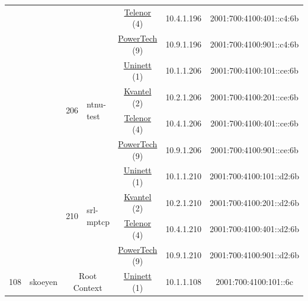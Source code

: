 \begin{small}
\begin{center}
\begin{longtable}{|c|c|c|c|c|c|c|c|}
  &  &  &  & \multicolumn{2}{|c|}{\tiny{\href{https://www.telenor.no}{Telenor} (4)}} & \tiny{10.4.1.196} & \tiny{2001:700:4100:401::c4:6b} \\* \cline{5-5}\cline{6-6}\cline{7-7}\cline{8-8}
  &  &  &  & \multicolumn{2}{|c|}{\tiny{\href{http://www.powertech.no}{PowerTech} (9)}} & \tiny{10.9.1.196} & \tiny{2001:700:4100:901::c4:6b} \\* \cline{3-3}\cline{4-4}\cline{5-5}\cline{6-6}\cline{7-7}\cline{8-8}
  &  & \multirow{4}{*}{\tiny{206}} & \multicolumn{1}{|l|}{\multirow{4}{*}{\tiny{ntnu-test}}} & \multicolumn{2}{|c|}{\tiny{\href{https://www.uninett.no}{Uninett} (1)}} & \tiny{10.1.1.206} & \tiny{2001:700:4100:101::ce:6b} \\* \cline{5-5}\cline{6-6}\cline{7-7}\cline{8-8}
  &  &  &  & \multicolumn{2}{|c|}{\tiny{\href{http://kvantel.no}{Kvantel} (2)}} & \tiny{10.2.1.206} & \tiny{2001:700:4100:201::ce:6b} \\* \cline{5-5}\cline{6-6}\cline{7-7}\cline{8-8}
  &  &  &  & \multicolumn{2}{|c|}{\tiny{\href{https://www.telenor.no}{Telenor} (4)}} & \tiny{10.4.1.206} & \tiny{2001:700:4100:401::ce:6b} \\* \cline{5-5}\cline{6-6}\cline{7-7}\cline{8-8}
  &  &  &  & \multicolumn{2}{|c|}{\tiny{\href{http://www.powertech.no}{PowerTech} (9)}} & \tiny{10.9.1.206} & \tiny{2001:700:4100:901::ce:6b} \\* \cline{3-3}\cline{4-4}\cline{5-5}\cline{6-6}\cline{7-7}\cline{8-8}
  &  & \multirow{4}{*}{\tiny{210}} & \multicolumn{1}{|l|}{\multirow{4}{*}{\tiny{srl-mptcp}}} & \multicolumn{2}{|c|}{\tiny{\href{https://www.uninett.no}{Uninett} (1)}} & \tiny{10.1.1.210} & \tiny{2001:700:4100:101::d2:6b} \\* \cline{5-5}\cline{6-6}\cline{7-7}\cline{8-8}
  &  &  &  & \multicolumn{2}{|c|}{\tiny{\href{http://kvantel.no}{Kvantel} (2)}} & \tiny{10.2.1.210} & \tiny{2001:700:4100:201::d2:6b} \\* \cline{5-5}\cline{6-6}\cline{7-7}\cline{8-8}
  &  &  &  & \multicolumn{2}{|c|}{\tiny{\href{https://www.telenor.no}{Telenor} (4)}} & \tiny{10.4.1.210} & \tiny{2001:700:4100:401::d2:6b} \\* \cline{5-5}\cline{6-6}\cline{7-7}\cline{8-8}
  &  &  &  & \multicolumn{2}{|c|}{\tiny{\href{http://www.powertech.no}{PowerTech} (9)}} & \tiny{10.9.1.210} & \tiny{2001:700:4100:901::d2:6b} \\ \hline
 \multirow{16}{*}{\tiny{108}} & \multicolumn{1}{|l|}{\multirow{16}{*}{\tiny{skoeyen}}} & \multicolumn{2}{|c|}{\multirow{4}{*}{\tiny{Root Context}}} & \multicolumn{2}{|c|}{\tiny{\href{https://www.uninett.no}{Uninett} (1)}} & \tiny{10.1.1.108} & \tiny{2001:700:4100:101::6c} \\* \cline{5-5}\cline{6-6}\cline{7-7}\cline{8-8}

\end{longtable}
\end{center}
\end{small}
